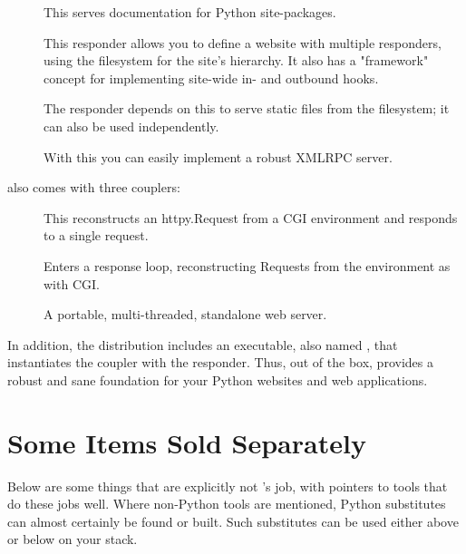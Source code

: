 \begin{description}

\item[]
    {This serves documentation for Python site-packages.}

\item[]
    {This responder allows you to define a website with multiple responders,
    using the filesystem for the site's hierarchy. It also has a "framework"
    concept for implementing site-wide in- and outbound hooks.}

\item[]
    {The  responder depends on this to serve static files from
    the filesystem; it can also be used independently.}

\item[]
    {With this you can easily implement a robust XMLRPC server.}

\end{description}


 also comes with three couplers:

\begin{description}

\item[]
    {This reconstructs an httpy.Request from a CGI environment and responds to
    a single request.}

\item[]
    {Enters a response loop, reconstructing Requests from the environment as
    with CGI.}

\item[]
    {A portable, multi-threaded, standalone web server.}

\end{description}


In addition, the  distribution includes an executable, also named
, that instantiates the  coupler with the
 responder. Thus, out of the box,  provides a
robust and sane foundation for your Python websites and web applications.


\section{Some Items Sold Separately}

Below are some things that are explicitly not 's job, with
pointers to tools that do these jobs well. Where non-Python tools are mentioned,
Python substitutes can almost certainly be found or built. Such substitutes can
be used either above or below  on your stack.

